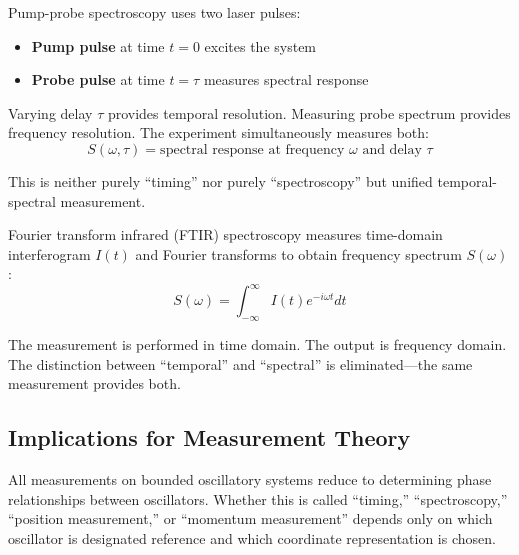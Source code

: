 \begin{example}
\label{ex:pump_probe}
Pump-probe spectroscopy uses two laser pulses:
\begin{itemize}
\item \textbf{Pump pulse} at time $t=0$ excites the system
\item \textbf{Probe pulse} at time $t = \tau$ measures spectral response
\end{itemize}

Varying delay $\tau$ provides temporal resolution. Measuring probe spectrum provides frequency resolution. The experiment simultaneously measures both:
\begin{equation}
S(\omega, \tau) = \text{spectral response at frequency } \omega \text{ and delay } \tau
\end{equation}

This is neither purely ``timing'' nor purely ``spectroscopy'' but unified temporal-spectral measurement.
\end{example}

\begin{example}
\label{ex:ft_spectroscopy}
Fourier transform infrared (FTIR) spectroscopy measures time-domain interferogram $I(t)$ and Fourier transforms to obtain frequency spectrum $S(\omega)$:
\begin{equation}
S(\omega) = \int_{-\infty}^{\infty} I(t) e^{-i\omega t} dt
\end{equation}

The measurement is performed in time domain. The output is frequency domain. The distinction between ``temporal'' and ``spectral'' is eliminated—the same measurement provides both.
\end{example}

\subsection{Implications for Measurement Theory}

\begin{corollary}
\label{cor:measurement_unification}
All measurements on bounded oscillatory systems reduce to determining phase relationships between oscillators. Whether this is called ``timing,'' ``spectroscopy,'' ``position measurement,'' or ``momentum measurement'' depends only on which oscillator is designated reference and which coordinate representation is chosen.
\end{corollary}

